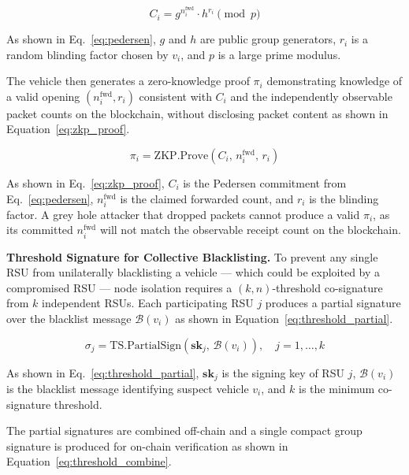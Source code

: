 \documentclass[12pt, a4paper]{report}
\begin{document}
\begin{equation}
\label{eq:pedersen}
C_i = g^{n_i^{\text{fwd}}} \cdot h^{r_i} \pmod{p}
\end{equation}

As shown in Eq.~\eqref{eq:pedersen}, $g$ and $h$ are public group 
generators, $r_i$ is a random blinding factor chosen by $v_i$, and 
$p$ is a large prime modulus.

The vehicle then generates a zero-knowledge proof $\pi_i$ demonstrating
knowledge of a valid opening $(n_i^{\text{fwd}}, r_i)$ consistent with $C_i$
and the independently observable packet counts on the blockchain, without
disclosing packet content as shown in Equation~\eqref{eq:zkp_proof}.

\begin{equation}
\label{eq:zkp_proof}
\pi_i = \mathrm{ZKP.Prove}\!\left(C_i,\, n_i^{\text{fwd}},\, r_i\right)
\end{equation}

As shown in Eq.~\eqref{eq:zkp_proof}, $C_i$ is the Pedersen commitment 
from Eq.~\eqref{eq:pedersen}, $n_i^{\text{fwd}}$ is the claimed 
forwarded count, and $r_i$ is the blinding factor. A grey hole attacker 
that dropped packets cannot produce a valid $\pi_i$, as its committed 
$n_i^{\text{fwd}}$ will not match the observable receipt count on the 
blockchain.

\textbf{Threshold Signature for Collective Blacklisting.}
To prevent any single RSU from unilaterally blacklisting a vehicle — which
could be exploited by a compromised RSU — node isolation requires a
$(k,n)$-threshold co-signature from $k$ independent RSUs. Each participating
RSU $j$ produces a partial signature over the blacklist message $\mathcal{B}(v_i)$ as shown in Equation~\eqref{eq:threshold_partial}.

\begin{equation}
\label{eq:threshold_partial}
\sigma_j = \mathrm{TS.PartialSign}\!\left(\mathbf{sk}_j,\, \mathcal{B}(v_i)\right),
\quad j = 1,\ldots,k
\end{equation}

As shown in Eq.~\eqref{eq:threshold_partial}, $\mathbf{sk}_j$ is the 
signing key of RSU $j$, $\mathcal{B}(v_i)$ is the blacklist message 
identifying suspect vehicle $v_i$, and $k$ is the minimum co-signature 
threshold.

The partial signatures are combined off-chain and a single compact group
signature is produced for on-chain verification as shown in Equation~\eqref{eq:threshold_combine}.
\end{document}
